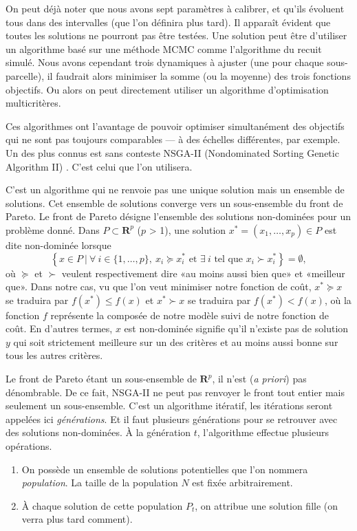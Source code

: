 On peut déjà noter que nous avons sept paramètres à calibrer, et qu'ils évoluent tous dans des intervalles (que l'on définira plus tard).
Il apparaît évident que toutes les solutions ne pourront pas être testées.
Une solution peut être d'utiliser un algorithme basé sur une méthode MCMC comme l'algorithme du recuit simulé.
Nous avons cependant trois dynamiques à ajuster (une pour chaque sous-parcelle), il faudrait alors minimiser la somme (ou la moyenne) des trois fonctions objectifs.
Ou alors on peut directement utiliser un algorithme d'optimisation multicritères.

Ces algorithmes ont l'avantage de pouvoir optimiser simultanément des objectifs qui ne sont pas toujours comparables --- à des échelles différentes, par exemple.
Un des plus connus est sans conteste NSGA-II (Nondominated Sorting Genetic Algorithm II) \citep{deb}.
C'est celui que l'on utilisera.

C'est un algorithme qui ne renvoie pas une unique solution mais un ensemble de solutions. 
Cet ensemble de solutions converge vers un sous-ensemble du front de Pareto.
Le front de Pareto désigne l'ensemble des solutions non-dominées pour un problème donné.
Dans $P \subset \mathbf{R}^{p}$ ($p$ > 1), une solution $x^* = \left( x_1, \ldots, x_p \right) \in  P$ est dite non-dominée lorsque
\[
\left\{ x \in P\ |\ \forall\ i \in \{1, \ldots, p\},\ x_i \succcurlyeq x_i^* \text{ et } \exists\ i \text{ tel que } x_i \succ x_i^* \right\} = \emptyset,
\]
où $\succcurlyeq$ et $\succ$ veulent respectivement dire «au moins aussi bien que» et «meilleur que». 
Dans notre cas, vu que l'on veut minimiser notre fonction de coût, $x^* \succcurlyeq x$ se traduira par $f(x^*) \leq f(x)$ et $x^* \succ x$ se traduira par $ f(x^*) < f(x)$, où la fonction $f$ représente la composée de notre modèle suivi de notre fonction de coût.
En d'autres termes, $x$ est non-dominée signifie qu'il n'existe pas de solution $y$ qui soit strictement meilleure sur un des critères et au moins aussi bonne sur tous les autres critères.

Le front de Pareto étant un sous-ensemble de $\mathbf{R}^{p}$, il n'est (\emph{a priori}) pas dénombrable.
De ce fait, NSGA-II ne peut pas renvoyer le front tout entier mais seulement un sous-ensemble.
C'est un algorithme itératif, les itérations seront appelées ici \emph{générations}.
Et il faut plusieurs générations pour se retrouver avec des solutions non-dominées.
À la génération $t$, l'algorithme effectue plusieurs opérations.
\begin{enumerate}
 \item On possède un ensemble de solutions potentielles que l'on nommera \emph{population}.
 La taille de la population $N$ est fixée arbitrairement.
 \item À chaque solution de cette population $P_t$, on attribue une solution fille (on verra plus tard comment). 
\end{enumerate}

